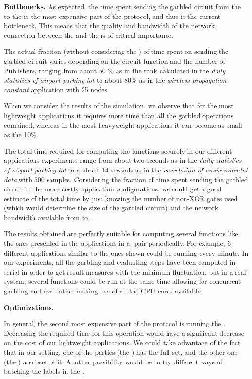 \noindent\textbf{Bottlenecks.}  As expected, the time spent sending the garbled
circuit from the \garbler to the \broker is the most expensive part of the
protocol, and thus is the current bottleneck.  This means that the quality and
bandwidth of the network connection between the \broker and the \garbler is of
critical importance.

The actual fraction (without considering the \PSI) of time spent on sending the
garbled circuit varies depending on the circuit function and the number of
Publishers, ranging from about 50 \% as in the rank calculated in the
\emph{daily statistics of airport parking lot} to about 80\% as in the
\emph{wireless propagation constant} application with 25 nodes.

When we consider the results of the \PSI simulation, we observe that for the
most lightweight applications it requires more time than all the garbled
operations combined, whereas in the most heavyweight applications it can become
as small as the 10\%.

The total time required for computing the functions securely in our different
applications experiments range from about two seconds as in the \emph{daily
statistics of airport parking lot} to a about 14 seconds as in the
\emph{correlation of environmental data} with 500 samples.  Considering the
fraction of time spent sending the garbled circuit in the more costly
application configurations, we could get a good estimate of the total time by
just knowing the number of non-XOR gates used (which would determine the size
of the garbled circuit) and the network bandwidth available from \broker to
\garbler.

The results obtained are perfectly suitable for computing several functions
like the ones presented in the applications in a \broker-\garbler pair
periodically.  For example, 6 different applications similar to the ones shown
could be running every minute.  In our experiments, all the garbling and
evaluating steps have been computed in serial in order to get result measures
with the minimum fluctuation, but in a real system, several functions could be
run at the same time allowing for concurrent garbling and evaluation making use
of all the CPU cores available.

\noindent\textbf{Optimizations.}

In general, the second most expensive part of the protocol is running the \PSI.
Decreasing the required time for this operation would have a significant
decrease on the cost of our lightweight applications.  We could take advantage
of the fact that in our \PSI setting, one of the parties (the \garbler) has the
full set, and the other one (the \broker) a subset of it.  Another possibility
would be to try different ways of batching the labels in the \PSI.

